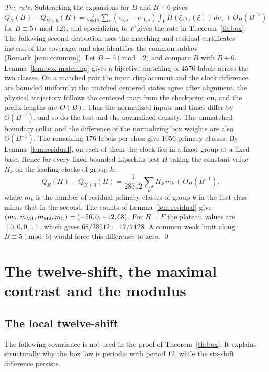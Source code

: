 \documentclass[11pt,reqno]{amsart}
\theoremstyle{remark}
\begin{document}
\emph{The rate.} Subtracting the expansions for \(B\) and \(B+6\) gives \(Q_B(H)-Q_{B+6}(H)=\frac{1}{28512}\sum_s(c_{5,s}-c_{11,s})\int_VH(\xi,\tau_s(\xi))\,d\nu_V+O_H(B^{-1})\) for \(B\equiv5\pmod{12}\), and specializing to \(F\) gives the rate in Theorem~\ref{th:box}. The following second derivation uses the matching and residual certificates instead of the coverage, and also identifies the common sublaw (Remark~\ref{rem:common}). Let \(B\equiv5\pmod{12}\) and compare \(B\) with \(B+6\). Lemma~\ref{lem:box-matching} gives a bijective matching of \(4576\) labels across the two classes. On a matched pair the input displacement and the clock difference are bounded uniformly: the matched centered states agree after alignment, the physical trajectory follows the centered map from the checkpoint on, and the prefix lengths are \(O(B)\). Thus the normalized inputs and times differ by \(O(B^{-1})\), and so do the test and the normalized density. The unmatched boundary collar and the difference of the normalizing box weights are also \(O(B^{-1})\). The remaining \(176\) labels per class give \(1056\) primary classes. By Lemma~\ref{lem:residual}, on each of them the clock lies in a fixed group at a fixed base. Hence for every fixed bounded Lipschitz test \(H\) taking the constant value \(H_k\) on the leading clocks of group \(k\),
\[
 Q_B(H)-Q_{B+6}(H)=\frac{1}{28512}\sum_k H_k\,m_k+O_H(B^{-1}),
\]
where \(m_k\) is the number of residual primary classes of group \(k\) in the first class minus that in the second. The counts of Lemma~\ref{lem:residual} give \((m_{\rm S},m_{\rm M1},m_{\rm M2},m_{\rm L})=(-56,0,-12,68)\). For \(H=F\) the plateau values are \((0,0,0,1)\), which gives \(68/28512=17/7128\). A common weak limit along \(B\equiv5\pmod6\) would force this difference to zero. \qed

\section{The twelve-shift, the maximal contrast and the modulus}\label{sec:twelve}

\subsection{The local twelve-shift}
The following covariance is not used in the proof of Theorem~\ref{th:box}. It explains structurally why the box law is periodic with period \(12\), while the six-shift difference persists.
\end{document}
